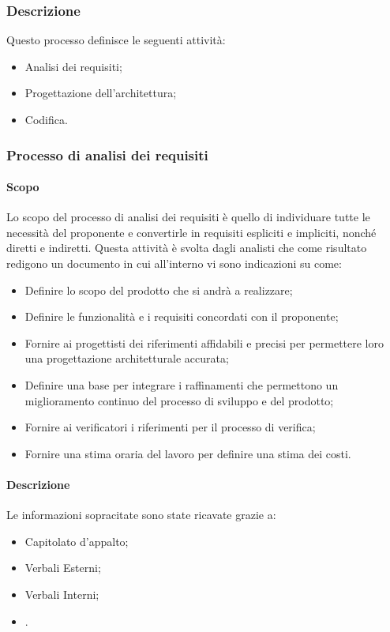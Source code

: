 \subsubsection{Descrizione}
Questo processo definisce le seguenti attività:
\begin{itemize}
  \item Analisi dei requisiti;
  \item Progettazione dell'architettura;
  \item Codifica.
\end{itemize}
\subsubsection{Processo di analisi dei requisiti}
\label{_processoAnalisiDeiRequisiti}
\paragraph{Scopo}
Lo scopo del processo di analisi dei requisiti è quello di individuare tutte le necessità del proponente e convertirle in requisiti espliciti e impliciti, nonché diretti e indiretti. Questa attività è svolta dagli analisti che come risultato redigono un documento in cui all'interno vi sono indicazioni su come:
\begin{itemize}
  \item Definire lo scopo del prodotto che si andrà a realizzare;
  \item Definire le funzionalità e i requisiti concordati con il proponente;
  \item Fornire ai progettisti dei riferimenti affidabili e precisi per permettere loro una progettazione architetturale accurata;
  \item Definire una base per integrare i raffinamenti che permettono un miglioramento continuo del processo di sviluppo e del prodotto;
  \item Fornire ai verificatori i riferimenti per il processo di verifica;
  \item Fornire una stima oraria del lavoro per definire una stima dei costi.
\end{itemize}

\paragraph{Descrizione}
Le informazioni sopracitate sono state ricavate grazie a:
\begin{itemize}
  \item Capitolato d'appalto;
  \item Verbali Esterni;
  \item Verbali Interni;
  \item {}.
\end{itemize}


